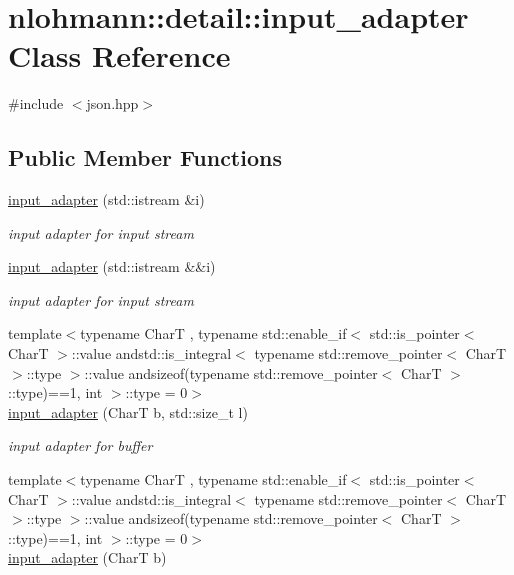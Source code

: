 \hypertarget{classnlohmann_1_1detail_1_1input__adapter}{}\section{nlohmann\+:\+:detail\+:\+:input\+\_\+adapter Class Reference}
\label{classnlohmann_1_1detail_1_1input__adapter}


{\ttfamily \#include $<$json.\+hpp$>$}

\subsection*{Public Member Functions}
\begin{DoxyCompactItemize}
\item 
\hyperlink{classnlohmann_1_1detail_1_1input__adapter_ae89f11268d4724b3080473f7218abe86}{input\+\_\+adapter} (std\+::istream \&i)
\begin{DoxyCompactList}\small\item\em input adapter for input stream \end{DoxyCompactList}\item 
\hyperlink{classnlohmann_1_1detail_1_1input__adapter_af002dd2e53ac0855a03cb68d0ce626b2}{input\+\_\+adapter} (std\+::istream \&\&i)
\begin{DoxyCompactList}\small\item\em input adapter for input stream \end{DoxyCompactList}\item 
{\footnotesize template$<$typename CharT , typename std\+::enable\+\_\+if$<$ std\+::is\+\_\+pointer$<$ Char\+T $>$\+::value andstd\+::is\+\_\+integral$<$ typename std\+::remove\+\_\+pointer$<$ Char\+T $>$\+::type $>$\+::value andsizeof(typename std\+::remove\+\_\+pointer$<$ Char\+T $>$\+::type)==1, int $>$\+::type  = 0$>$ }\\\hyperlink{classnlohmann_1_1detail_1_1input__adapter_a37816622d79ab4a1a76f4d7e872b65e1}{input\+\_\+adapter} (CharT b, std\+::size\+\_\+t l)
\begin{DoxyCompactList}\small\item\em input adapter for buffer \end{DoxyCompactList}\item 
{\footnotesize template$<$typename CharT , typename std\+::enable\+\_\+if$<$ std\+::is\+\_\+pointer$<$ Char\+T $>$\+::value andstd\+::is\+\_\+integral$<$ typename std\+::remove\+\_\+pointer$<$ Char\+T $>$\+::type $>$\+::value andsizeof(typename std\+::remove\+\_\+pointer$<$ Char\+T $>$\+::type)==1, int $>$\+::type  = 0$>$ }\\\hyperlink{classnlohmann_1_1detail_1_1input__adapter_a86f035d9c4319360014b922b5e433ced}{input\+\_\+adapter} (CharT b)

\end{DoxyCompactItemize}
